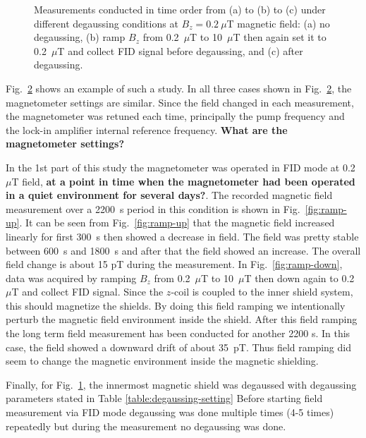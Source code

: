 \begin{figure}
\begin{subfigure}[b]{0.42\textwidth}
    \caption{}
    \label{fig:degauss}
  \end{subfigure}
  \caption{Measurements conducted in time order from (a) to (b) to (c)
    under different degaussing conditions at $B_z=0.2~\mu$T magnetic
    field: (a) no degaussing, (b) ramp $B_z$ from 0.2~$\mu$T to
    10~$\mu$T then again set it to 0.2~$\mu$T and collect FID signal
    before degaussing, and (c) after degaussing.}
  \label{fig:ramp-updown}
\end{figure}

Fig.~\ref{fig:ramp-updown} shows an example of such a study.  In all
three cases shown in Fig.~\ref{fig:ramp-updown}, the magnetometer
settings are similar.  Since the field changed in each measurement,
the magnetometer was retuned each time, principally the pump frequency
and the lock-in amplifier internal reference frequency.  {\bf What are
  the magnetometer settings?}
  

In the 1st part of this study the magnetometer was operated in FID
mode at 0.2~$\mu$T field, {\bf at a point in time when the
  magnetometer had been operated in a quiet environment for several
  days?}. The recorded magnetic field measurement over a 2200~s period
in this condition is shown in Fig.~\ref{fig:ramp-up}.  It can be seen
from Fig.~\ref{fig:ramp-up} that the magnetic field increased linearly
for first 300~s then showed a decrease in field. The field was pretty
stable between 600~s and 1800~s and after that the field showed an
increase. The overall field change is about 15 pT during the
measurement.  In Fig.~\ref{fig:ramp-down}, data was acquired by
ramping $B_z$ from 0.2~$\mu$T to 10~$\mu$T then down again to
0.2~$\mu$T and collect FID signal.  Since the $z$-coil is coupled to
the inner shield system, this should magnetize the shields.  By doing
this field ramping we intentionally perturb the magnetic field
environment inside the shield.  After this field ramping the long term
field measurement has been conducted for another 2200 s. In this case,
the field showed a downward drift of about 35~pT.  Thus field ramping
did seem to change the magnetic environment inside the magnetic
shielding. 

Finally, for Fig.~\ref{fig:degauss}, the innermost
magnetic shield was degaussed  with degaussing parameters stated in Table \ref{table:degaussing-setting}
Before starting field measurement via FID mode degaussing was done multiple times (4-5 times) repeatedly but during the measurement no degaussing was done. 
  
